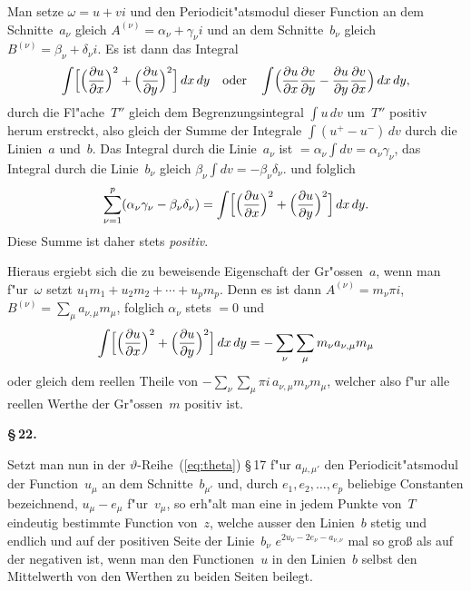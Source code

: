 \documentclass[12pt,a4paper]{book}
\theoremstyle{definition}
\theoremstyle{remark}
\begin{document}
Man setze $\omega = u + vi$ und den Periodicit"atsmodul dieser Function
an dem Schnitte~$a_\nu$ gleich $A^{(\nu)} = \alpha_\nu + \gamma_\nu i$ und an dem
Schnitte~$b_\nu$ gleich $B^{(\nu)} = \beta_\nu + \delta_\nu i$.
Es ist dann das Integral
\[
\int\Bigl[\Bigl(\frac{\partial u}{\partial x}\Bigr)^2
  + \Bigl(\frac{\partial u}{\partial y}\Bigr)^2\Bigr]\, dx\,dy
\quad\text{oder}\quad
\int\Bigl(\frac{\partial u}{\partial x}\frac{\partial v}{\partial y}
  - \frac{\partial u}{\partial y}\frac{\partial v}{\partial x}\Bigr)\, dx\,dy,
\]
durch die Fl"ache~$T''$ gleich dem Begrenzungsintegral $\int u\,dv$
um~$T''$ positiv herum erstreckt, also gleich der Summe der Integrale
$\int (u^+ - u^-)\, dv$ durch die Linien~$a$ und~$b$. Das Integral durch
die Linie~$a_\nu$ ist $= \alpha_\nu \int dv = \alpha_\nu \gamma_\nu$, das Integral durch
die Linie~$b_\nu$ gleich $\beta_\nu \int dv = -\beta_\nu \delta_\nu$.
und folglich
\[
\sum_{\nu=1}^{p} (\alpha_\nu \gamma_\nu - \beta_\nu \delta_\nu)
  = \int\Bigl[\Bigl(\frac{\partial u}{\partial x}\Bigr)^2
    + \Bigl(\frac{\partial u}{\partial y}\Bigr)^2\Bigr]\, dx\,dy.
\]
Diese Summe ist daher stets \emph{positiv}.

Hieraus ergiebt sich die zu beweisende Eigenschaft der Gr"ossen~$a$,
wenn man f"ur~$\omega$ setzt $u_1 m_1 + u_2 m_2 + \cdots + u_p m_p$. Denn es ist
dann $A^{(\nu)} = m_\nu \pi i$, $B^{(\nu)} = \sum_\mu a_{\nu,\mu} m_\mu$, folglich
$\alpha_\nu$ stets $= 0$ und
\[
\int\Bigl[\Bigl(\frac{\partial u}{\partial x}\Bigr)^2
  + \Bigl(\frac{\partial u}{\partial y}\Bigr)^2\Bigr]\, dx\,dy
= -\sum_\nu \sum_\mu m_\nu a_{\nu,\mu} m_\mu
\]
oder gleich dem reellen Theile von $-\sum_\nu \sum_\mu \pi i\, a_{\nu,\mu} m_\nu m_\mu$,
welcher also f"ur alle reellen Werthe der Gr"ossen~$m$ positiv ist.

\medskip
\textbf{\S\,22.}

Setzt man nun in der $\vartheta$-Reihe~(\ref{eq:theta}) \S\,17 f"ur
$a_{\mu,\mu'}$ den Periodicit"atsmodul der Function~$u_\mu$ an dem Schnitte~$b_{\mu'}$
und, durch $e_1, e_2, \ldots, e_p$ beliebige Constanten bezeichnend,
$u_\mu - e_\mu$ f"ur~$v_\mu$, so erh"alt man eine in jedem Punkte von~$T$
eindeutig bestimmte Function von~$z$, welche ausser den Linien~$b$ stetig
und endlich und auf der positiven Seite der Linie~$b_\nu$
$e^{2u_\nu - 2e_\nu - a_{\nu,\nu}}$ mal so gro\ss{} als auf der negativen ist, wenn man
den Functionen~$u$ in den Linien~$b$ selbst den Mittelwerth von den
Werthen zu beiden Seiten beilegt.
\end{document}
